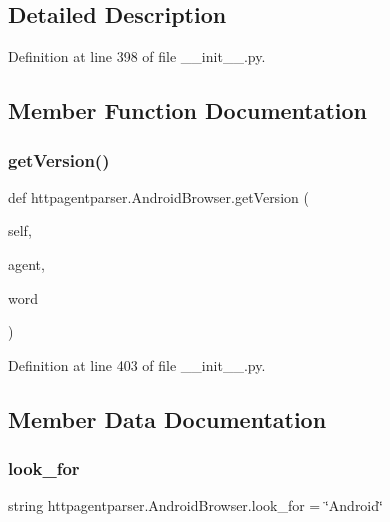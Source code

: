 \subsection{Detailed Description}


Definition at line 398 of file \+\_\+\+\_\+init\+\_\+\+\_\+.\+py.



\subsection{Member Function Documentation}
\hypertarget{classhttpagentparser_1_1_android_browser_a7b62bb8b7b556f15999ca06e2aa0e33f}{}\label{classhttpagentparser_1_1_android_browser_a7b62bb8b7b556f15999ca06e2aa0e33f} 
\subsubsection{\texorpdfstring{get\+Version()}{getVersion()}}
{\footnotesize\ttfamily def httpagentparser.\+Android\+Browser.\+get\+Version (\begin{DoxyParamCaption}\item[{}]{self,  }\item[{}]{agent,  }\item[{}]{word }\end{DoxyParamCaption})}



Definition at line 403 of file \+\_\+\+\_\+init\+\_\+\+\_\+.\+py.



\subsection{Member Data Documentation}
\hypertarget{classhttpagentparser_1_1_android_browser_a5a0029db816b0e4fe11effa4f5cb6751}{}\label{classhttpagentparser_1_1_android_browser_a5a0029db816b0e4fe11effa4f5cb6751} 
\subsubsection{\texorpdfstring{look\+\_\+for}{look\_for}}
{\footnotesize\ttfamily string httpagentparser.\+Android\+Browser.\+look\+\_\+for = \char`\"{}Android\char`\"{}\hspace{0.3cm}{\ttfamily [static]}}




